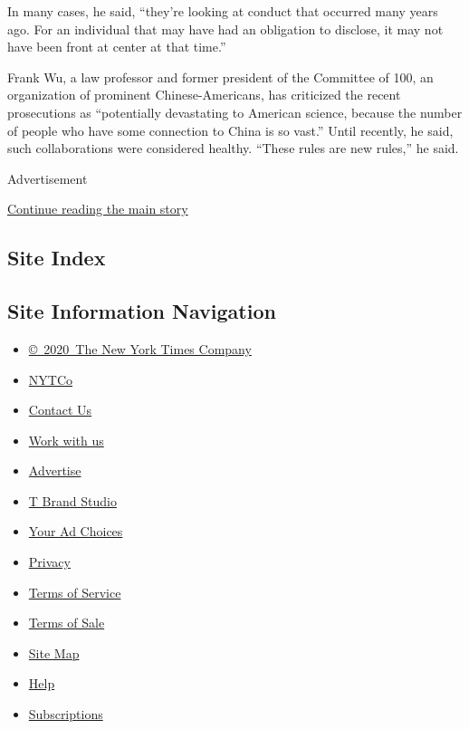 In many cases, he said, ``they're looking at conduct that occurred many
years ago. For an individual that may have had an obligation to
disclose, it may not have been front at center at that time.''

Frank Wu, a law professor and former president of the Committee of 100,
an organization of prominent Chinese-Americans, has criticized the
recent prosecutions as ``potentially devastating to American science,
because the number of people who have some connection to China is so
vast.'' Until recently, he said, such collaborations were considered
healthy. ``These rules are new rules,'' he said.

Advertisement

\protect\hyperlink{after-bottom}{Continue reading the main story}

\hypertarget{site-index}{%
\subsection{Site Index}\label{site-index}}

\hypertarget{site-information-navigation}{%
\subsection{Site Information
Navigation}\label{site-information-navigation}}

\begin{itemize}
\tightlist
\item
  \href{https://help.nytimes3xbfgragh.onion/hc/en-us/articles/115014792127-Copyright-notice}{©~2020~The
  New York Times Company}
\end{itemize}

\begin{itemize}
\tightlist
\item
  \href{https://www.nytco.com/}{NYTCo}
\item
  \href{https://help.nytimes3xbfgragh.onion/hc/en-us/articles/115015385887-Contact-Us}{Contact
  Us}
\item
  \href{https://www.nytco.com/careers/}{Work with us}
\item
  \href{https://nytmediakit.com/}{Advertise}
\item
  \href{http://www.tbrandstudio.com/}{T Brand Studio}
\item
  \href{https://www.nytimes3xbfgragh.onion/privacy/cookie-policy\#how-do-i-manage-trackers}{Your
  Ad Choices}
\item
  \href{https://www.nytimes3xbfgragh.onion/privacy}{Privacy}
\item
  \href{https://help.nytimes3xbfgragh.onion/hc/en-us/articles/115014893428-Terms-of-service}{Terms
  of Service}
\item
  \href{https://help.nytimes3xbfgragh.onion/hc/en-us/articles/115014893968-Terms-of-sale}{Terms
  of Sale}
\item
  \href{https://spiderbites.nytimes3xbfgragh.onion}{Site Map}
\item
  \href{https://help.nytimes3xbfgragh.onion/hc/en-us}{Help}
\item
  \href{https://www.nytimes3xbfgragh.onion/subscription?campaignId=37WXW}{Subscriptions}
\end{itemize}
